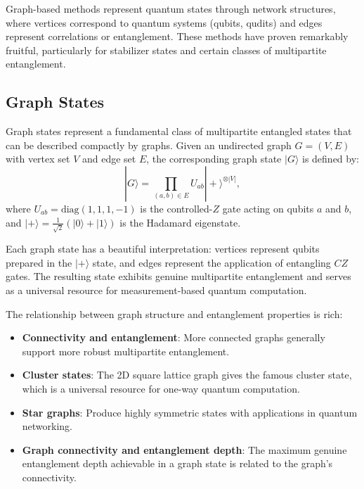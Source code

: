 \documentclass[%
 amsmath,amssymb,
 aps,
rmp,
]{revtex4-2}
\begin{document}
Graph-based methods represent quantum states through network structures, where vertices correspond to quantum systems (qubits, qudits) and edges represent correlations or entanglement. These methods have proven remarkably fruitful, particularly for stabilizer states and certain classes of multipartite entanglement.

\subsection{Graph States}
\label{sec:graph-states}

Graph states represent a fundamental class of multipartite entangled states that can be described compactly by graphs. Given an undirected graph $G = (V, E)$ with vertex set $V$ and edge set $E$, the corresponding graph state $|G\rangle$ is defined by:
\begin{equation}
	|G\rangle = \prod_{(a,b) \in E} U_{ab} |+\rangle^{\otimes |V|},
\end{equation}
where $U_{ab} = \text{diag}(1, 1, 1, -1)$ is the controlled-$Z$ gate acting on qubits $a$ and $b$, and $|+\rangle = \frac{1}{\sqrt{2}}(|0\rangle + |1\rangle)$ is the Hadamard eigenstate.




Each graph state has a beautiful interpretation: vertices represent qubits prepared in the $|+\rangle$ state, and edges represent the application of entangling $CZ$ gates. The resulting state exhibits genuine multipartite entanglement and serves as a universal resource for measurement-based quantum computation.

The relationship between graph structure and entanglement properties is rich:
\begin{itemize}
	\item \textbf{Connectivity and entanglement}: More connected graphs generally support more robust multipartite entanglement.
	\item \textbf{Cluster states}: The 2D square lattice graph gives the famous cluster state, which is a universal resource for one-way quantum computation.
	\item \textbf{Star graphs}: Produce highly symmetric states with applications in quantum networking.
	\item \textbf{Graph connectivity and entanglement depth}: The maximum genuine entanglement depth achievable in a graph state is related to the graph's connectivity.
\end{itemize}
\end{document}
